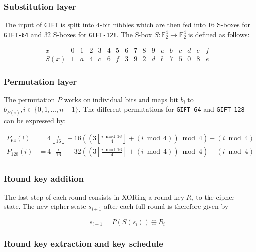 \documentclass[12pt]{report}
\newcommand{\F}[1]{\mathbb{F}_2^{#1}}
\begin{document}
\subsubsection{Substitution layer}

The input of \texttt{GIFT} is split into 4-bit nibbles which are then fed into
16 S-boxes for \texttt{GIFT-64} and 32 S-boxes for \texttt{GIFT-128}. The S-box
$S:\F{4}\rightarrow \F{4}$ is defined as follows:

\[
    \begin{array}{l|cccccccccccccccc}
        x & 0 & 1 & 2 & 3 & 4 & 5 & 6 & 7 & 8 & 9 & a & b & c & d & e & f \\
        \hline
        S(x) & 1 & a & 4 & c & 6 & f & 3 & 9 & 2 & d & b & 7 & 5 & 0 & 8 & e
    \end{array}
\]

\subsubsection{Permutation layer}

The permutation $P$ works on individual bits and maps bit $b_i$ to $b_{P(i)},
i\in\{0,1,\dots,n-1\}$. The different permutations for \texttt{GIFT-64} and
\texttt{GIFT-128} can be expressed by:

\begin{align*}
    P_{64}(i)&=4\left\lfloor\frac{i}{16}\right\rfloor+16\left(\left(3\left\lfloor\frac{i\bmod 16}{4}\right\rfloor+(i\bmod 4)\right)\bmod 4\right)+(i\bmod 4) \\
    P_{128}(i)&=4\left\lfloor\frac{i}{16}\right\rfloor+32\left(\left(3\left\lfloor\frac{i\bmod 16}{4}\right\rfloor+(i\bmod 4)\right)\bmod 4\right)+(i\bmod 4) \\
\end{align*}

\subsubsection{Round key addition}

The last step of each round consists in XORing a round key $R_i$ to the cipher
state. The new cipher state $s_{i+1}$ after each full round is therefore given
by

\[
    s_{i+1}=P(S(s_i))\oplus R_i
\]

\subsubsection{Round key extraction and key schedule}
\end{document}
